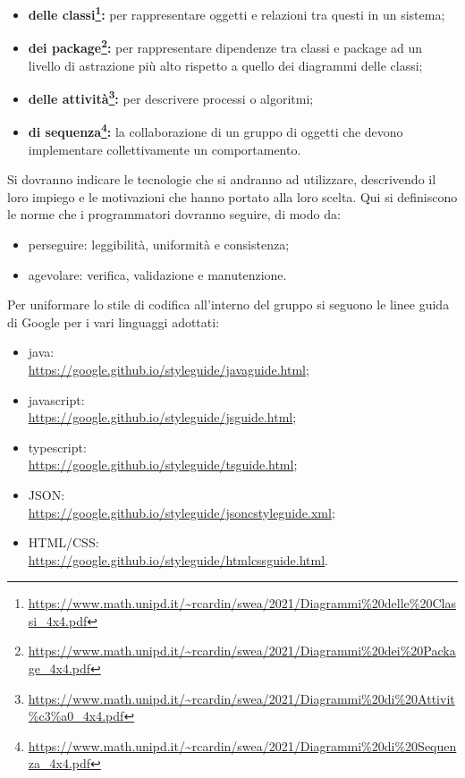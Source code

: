                 \begin{itemize}
                    \item \textbf{delle classi\footnote{\url{https://www.math.unipd.it/~rcardin/swea/2021/Diagrammi\%20delle\%20Classi_4x4.pdf}}: }per rappresentare oggetti e relazioni tra questi in un sistema;
                    \item \textbf{dei package\footnote{\url{https://www.math.unipd.it/~rcardin/swea/2021/Diagrammi\%20dei\%20Package_4x4.pdf}}: }per rappresentare dipendenze tra classi e package ad un livello di astrazione più alto rispetto a quello dei diagrammi delle classi;
                        \item \textbf{delle attività\footnote{\url{https://www.math.unipd.it/~rcardin/swea/2021/Diagrammi\%20di\%20Attivit\%c3\%a0_4x4.pdf}}: }per descrivere processi o algoritmi;
                    \item \textbf{di sequenza\footnote{\url{https://www.math.unipd.it/~rcardin/swea/2021/Diagrammi\%20di\%20Sequenza_4x4.pdf}}: }la collaborazione di un gruppo di oggetti che devono implementare collettivamente un comportamento.
                \end{itemize}
                Si dovranno indicare le tecnologie che si andranno ad utilizzare, descrivendo il loro impiego e le motivazioni che hanno portato alla loro scelta.
            Qui si definiscono le norme che i programmatori dovranno seguire, di modo da:
             \begin{itemize}
                 \item perseguire: leggibilità, uniformità e consistenza;
                 \item agevolare: verifica, validazione e manutenzione.
             \end{itemize}
             Per uniformare lo stile di codifica all'interno del gruppo si seguono le linee guida di Google per i vari linguaggi adottati:
             \begin{itemize}
                 \item java: \\\url{https://google.github.io/styleguide/javaguide.html};
                 \item javascript: \\\url{https://google.github.io/styleguide/jsguide.html};
                 \item typescript: \\\url{https://google.github.io/styleguide/tsguide.html};
                 \item JSON: \\\url{https://google.github.io/styleguide/jsoncstyleguide.xml};
                 \item HTML/CSS: \\\url{https://google.github.io/styleguide/htmlcssguide.html}.
             \end{itemize}

